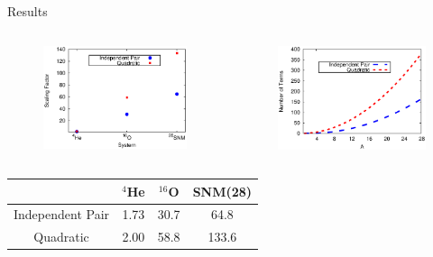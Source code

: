 \documentclass{beamer}
\begin{document}
\begin{frame}{Results}
\begin{columns}
\begin{column}{0.55\textwidth}
\begin{figure}[h]
   \centering
   \includegraphics[width=\textwidth]{figures/scaling.eps}
\end{figure}
\end{column}
\begin{column}{0.55\textwidth}
\begin{figure}[h]
   \centering
   \includegraphics[width=\textwidth]{figures/scaling_theory.eps}
\end{figure}
\end{column}
\end{columns}
\begin{table}[h!]
   \centering
   \begin{tabular}{cccc}
      \hline \hline
       & $^{4}$He & $^{16}$O & SNM(28)\\
      \hline
      Independent Pair & 1.73 & 30.7 & 64.8 \\
      Quadratic & 2.00 & 58.8 & 133.6 \\
      \hline \hline
   \end{tabular}
\end{table}
\end{frame}
\end{document}

